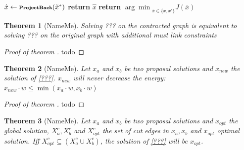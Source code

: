\documentclass[10pt,twocolumn,letterpaper]{article}
\newtheorem{theorem}{Theorem}
\begin{document}
\begin{algorithm}
\begin{scriptsize}
\begin{algorithmic}[1]
\State $\hat{x} \gets \textbf{\scriptsize{ProjectBack}}(\tilde{x}^*)$
\State \textbf{return} $\hat{x}$
\EndProcedure
\vspace{0.3cm}
\State \textbf{return} ${\arg\min}_{\bar{x} \in \{x,x'\}}J(\bar{x})$
\EndProcedure
\end{algorithmic}
\end{scriptsize}
\end{algorithm}






\begin{theorem}[NameMe]
Solving ??? on the contracted graph is 
equivalent to solving ??? on the 
original graph with additional 
must link constraints
\end{theorem}

\begin{proof}[Proof of theorem ]
todo
\end{proof}



\begin{theorem}[NameMe]
Let $x_{a}$ and $x_{b}$ be two proposal solutions and  $x_{new}$ the solution of \ref{???}.
$x_{new}$  will never decrease the energy:
$x_{new} \cdot w \leq  \min( x_{a}\cdot w,  x_{b}\cdot w) $ 
\end{theorem}

\begin{proof}[Proof of theorem ]
todo
\end{proof}



\begin{theorem}[NameMe]

Let $x_{a}$ and $x_{b}$ be two proposal solutions and  $x_{opt}$ the global solution,
$X_{a}^c, X_{b}^c$ and $ X_{opt}^c$ the set of cut edges in  $x_{a}, x_{b}$  and $ x_{opt}$
optimal solution.
Iff  $ X_{opt}^c \subseteq  (X_{a}^c \cup X_{b}^c)$,  the solution of \ref{???} will be $x_{opt}$.
\end{theorem}
\end{document}
